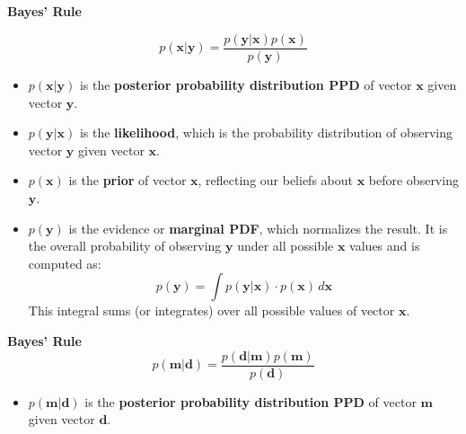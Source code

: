 \documentclass[aspectratio=169]{beamer}
\begin{document}
\subsection{}
\begin{frame}{\textbf{Bayes' Rule}} 

\[ p(\mathbf{x}| \mathbf{y}) = \frac{ p(\mathbf{y}| \mathbf{x}) p(\mathbf{x})}{p(\mathbf{y})}  \]

\begin{itemize}
  \item [$-$] $p(\mathbf{x} | \mathbf{y})$ is the \textbf{posterior probability distribution PPD} of vector $\mathbf{x}$ given vector $\mathbf{y}$.
  \item [$-$] $p(\mathbf{y} | \mathbf{x})$ is the \textbf{likelihood}, which is the probability distribution of observing vector $\mathbf{y}$ given vector $\mathbf{x}$.
  \item [$-$] $p(\mathbf{x})$ is the \textbf{prior} of vector $\mathbf{x}$, reflecting our beliefs about $\mathbf{x}$ before observing $\mathbf{y}$.
  \item [$-$] $p(\mathbf{y})$ is the evidence or \textbf{marginal PDF}, which normalizes the result. It is the overall probability of observing $\mathbf{y}$ under all possible $\mathbf{x}$ values and is computed as:
  \[
    p(\mathbf{y}) = \int p(\mathbf{y} | \mathbf{x}) \cdot p(\mathbf{x}) \, d\mathbf{x} \] 
  This integral sums (or integrates) over all possible values of vector $\mathbf{x}$.
\end{itemize}

\end{frame}



\begin{frame}{\textbf{Bayes' Rule}} 
\[ p(\mathbf{m}| \mathbf{d}) = \frac{ p(\mathbf{d}| \mathbf{m}) p(\mathbf{m})}{p(\mathbf{d})}  \]

\begin{itemize}
  \item [$-$] $p(\mathbf{m} | \mathbf{d})$ is the \textbf{posterior probability distribution PPD} of vector $\mathbf{m}$ given vector $\mathbf{d}$.
\end{itemize}
\end{frame}
\end{document}
